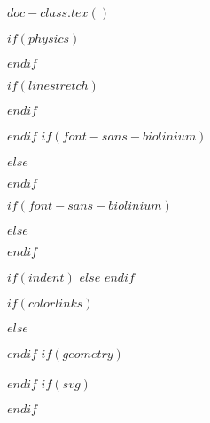 $doc-class.tex()$


\usepackage{amsmath}
\usepackage{amsthm}
\usepackage{amssymb}
$if(physics)$
\usepackage[italicdiff]{physics}
$endif$

$if(linestretch)$
\usepackage{setspace}
$endif$
\usepackage{iftex}
\ifPDFTeX
  \usepackage[$if(fontenc)$$fontenc$$else$OT1,T1$endif$]{fontenc}
  \usepackage[utf8]{inputenc}
  \usepackage{textcomp} %
  \usepackage{newpxtext}
  \usepackage{mathpazo}
  $endif$
  $if(font-sans-biolinium)$
  \usepackage[scale=0.95]{biolinum}
  $else$
  \usepackage[scaled]{helvet}
  $endif$
  \usepackage[scale=0.95,varl]{inconsolata}
\else %
  \usepackage[scale=0.95,varl]{inconsolata}
  \usepackage{newpxtext}
  \usepackage{mathpazo}
  $if(font-sans-biolinium)$
  \usepackage[scale=0.95]{biolinum}
  $else$
  \usepackage[scaled]{helvet}
  $endif$
\fi
\ifLuaTeX
  \usepackage{selnolig}  %
\fi
{}

$if(indent)$
$else$
\setlength{\parindent}{0pt}
\setlength{\parskip}{6pt plus 2pt minus 1pt}
$endif$
\setlength{\emergencystretch}{3em} %
\flushbottom
\allowdisplaybreaks
\sloppy


$if(colorlinks)$
\usepackage[dvipsnames,svgnames,x11names]{xcolor}
$else$
\usepackage{xcolor}
$endif$
$if(geometry)$
\usepackage[$for(geometry)$$geometry$$sep$,$endfor$]{geometry}
$endif$
$if(svg)$
\usepackage{svg}
$endif$
\usepackage[format=plain,
  labelfont={bf,sf,small,singlespacing},
  textfont={sf,small,singlespacing},
  justification=justified,
  margin=0.25in]{caption}

